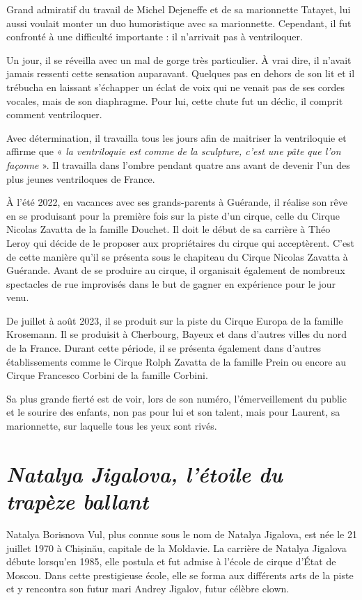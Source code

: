 Grand admiratif du travail de Michel Dejeneffe et de sa marionnette Tatayet, lui aussi voulait monter un duo humoristique avec sa marionnette. Cependant, il fut confronté à une difficulté importante : il n’arrivait pas à ventriloquer.

Un jour, il se réveilla avec un mal de gorge très particulier. À vrai dire, il n’avait jamais ressenti cette sensation auparavant. Quelques pas en dehors de son lit et il trébucha en laissant s’échapper un éclat de voix qui ne venait pas de ses cordes vocales, mais de son diaphragme. Pour lui, cette chute fut un déclic, il comprit comment ventriloquer.

Avec détermination, il travailla tous les jours afin de maitriser la ventriloquie et affirme que « \textit{la ventriloquie est comme de la sculpture, c’est une pâte que l’on façonne} ». Il travailla dans l’ombre pendant quatre ans avant de devenir l’un des plus jeunes ventriloques de France.

À l’été 2022, en vacances avec ses grands-parents à Guérande, il réalise son rêve en se produisant pour la première fois sur la piste d’un cirque, celle du Cirque Nicolas Zavatta de la famille Douchet. Il doit le début de sa carrière à Théo Leroy qui décide de le proposer aux propriétaires du cirque qui acceptèrent. C’est de cette manière qu’il se présenta sous le chapiteau du Cirque Nicolas Zavatta à Guérande. Avant de se produire au cirque, il organisait également de nombreux spectacles de rue improvisés dans le but de gagner en expérience pour le jour venu.

De juillet à août 2023, il se produit sur la piste du Cirque Europa de la famille Krosemann. Il se produisit à Cherbourg, Bayeux et dans d’autres villes du nord de la France. Durant cette période, il se présenta également dans d’autres établissements comme le Cirque Rolph Zavatta de la famille Prein ou encore au Cirque Francesco Corbini de la famille Corbini.

Sa plus grande fierté est de voir, lors de son numéro, l’émerveillement du public et le sourire des enfants, non pas pour lui et son talent, mais pour Laurent, sa marionnette, sur laquelle tous les yeux sont rivés.

\section*{\textit{Natalya Jigalova, l’étoile du trapèze ballant }}
{}
\noindent
Natalya Borisnova Vul, plus connue sous le nom de Natalya Jigalova, est née le 21 juillet 1970 à Chișinău, capitale de la Moldavie. La carrière de Natalya Jigalova débute lorsqu’en 1985, elle postula et fut admise à l'école de cirque d'État de Moscou. Dans cette prestigieuse école, elle se forma aux différents arts de la piste et y rencontra son futur mari Andrey Jigalov, futur célèbre clown. 

